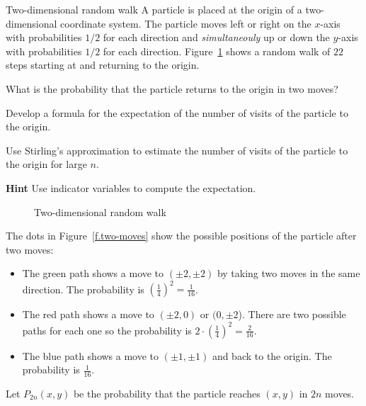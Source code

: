\begin{prob}{Two-dimensional random walk}
A particle is placed at the origin of a two-dimensional coordinate system. The particle moves left or right on the $x$-axis with probabilities $1/2$ for each direction and \emph{simultaneouly} up or down the $y$-axis with probabilities $1/2$ for each direction. Figure~\ref{f.2d-random-walk} shows a random walk of $22$ steps starting at and returning to the origin.

 What is the probability that the particle returns to the origin in two moves?

 Develop a formula for the expectation of the number of visits of the particle to the origin.

 Use Stirling's approximation to estimate the number of visits of the particle to the origin for large $n$.

\textbf{Hint} Use indicator variables to compute the expectation.

\begin{figure}[t]
\begin{center}
\end{center}
\caption{Two-dimensional random walk}\label{f.2d-random-walk}
\end{figure}
\end{prob}

\solution{}

The dots in Figure~\ref{f.two-moves} show the possible positions of the particle after two moves:
\begin{itemize}
\item The green path shows a move to $(\pm 2, \pm 2)$ by taking two moves in the same direction. The probability is $\left(\frac{1}{4}\right)^2= \frac{1}{16}$.
\item The red path shows a move to $(\pm 2,0)$ or $(0,\pm 2$). There are two possible paths for each one so the probability is $2\cdot\left(\frac{1}{4}\right)^2= \frac{2}{16}$.
\item The blue path shows a move to $(\pm 1,\pm 1)$ and back to the origin. The probability is $\frac{1}{16}$.
\end{itemize}
Let $P_{2n}(x,y)$ be the probability that the particle reaches $(x,y)$ in $2n$ moves.

